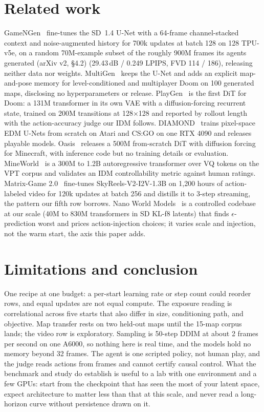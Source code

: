 \documentclass[10pt]{article}
\begin{document}
\section{Related work}
GameNGen~\citep{valevski2024gamengen} fine-tunes the SD~1.4 U-Net with a 64-frame channel-stacked context and noise-augmented history for 700k updates at batch 128 on 128 TPU-v5e, on a random 70M-example subset of the roughly 900M frames its agents generated (arXiv v2, \S4.2) (29.43\,dB / 0.249 LPIPS, FVD 114 / 186), releasing neither data nor weights. MultiGen~\citep{po2026multigen} keeps the U-Net and adds an explicit map-and-pose memory for level-conditioned and multiplayer Doom on 100 generated maps, disclosing no hyperparameters or release. PlayGen~\citep{playgen2024} is the first DiT for Doom: a 131M transformer in its own VAE with a diffusion-forcing recurrent state, trained on 200M transitions at 128$\times$128 and reported by rollout length with the action-accuracy judge our IDM follows. DIAMOND~\citep{alonso2024diamond} trains pixel-space EDM U-Nets from scratch on Atari and CS:GO on one RTX 4090 and releases playable models. Oasis~\citep{oasis2024} releases a 500M from-scratch DiT with diffusion forcing for Minecraft, with inference code but no training details or evaluation. MineWorld~\citep{mineworld2025} is a 300M to 1.2B autoregressive transformer over VQ tokens on the VPT corpus and validates an IDM controllability metric against human ratings. Matrix-Game 2.0~\citep{he2025matrixgame2} fine-tunes SkyReels-V2-I2V-1.3B on 1,200 hours of action-labeled video for 120k updates at batch 256 and distills it to 3-step streaming, the pattern our fifth row borrows. Nano World Models~\citep{huang2026nanowm} is a controlled codebase at our scale (40M to 830M transformers in SD KL-f8 latents) that finds $\epsilon$-prediction worst and prices action-injection choices; it varies scale and injection, not the warm start, the axis this paper adds.

\section{Limitations and conclusion}
One recipe at one budget: a per-start learning rate or step count could reorder rows, and equal updates are not equal compute. The exposure reading is correlational across five starts that also differ in size, conditioning path, and objective. Map transfer rests on two held-out maps until the 15-map corpus lands; the video row is exploratory. Sampling is 50-step DDIM at about 2 frames per second on one A6000, so nothing here is real time, and the models hold no memory beyond 32 frames. The agent is one scripted policy, not human play, and the judge reads actions from frames and cannot certify causal control. What the benchmark and study do establish is useful to a lab with one environment and a few GPUs: start from the checkpoint that has seen the most of your latent space, expect architecture to matter less than that at this scale, and never read a long-horizon curve without persistence drawn on it.
\end{document}
